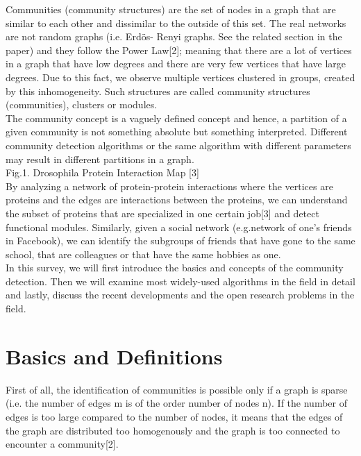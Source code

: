 \documentclass[10pt]{article}
\begin{document}
Communities (community structures) are the set of nodes in a graph that are similar to each other and dissimilar to the outside of this set. The real networks are not random graphs (i.e. Erdös- Renyi graphs. See the related section in the paper) and they follow the Power Law[2]; meaning that there are a lot of vertices in a graph that have low degrees and there are very few vertices that have large degrees. Due to this fact, we observe multiple vertices clustered in groups, created by this inhomogeneity. Such structures are called community structures (communities), clusters or modules. \\

The community concept is a vaguely defined concept and hence, a partition of a given community is not something absolute but something interpreted. Different community detection algorithms or the same algorithm with different parameters may result in different partitions in a graph.\\

Fig.1. Drosophila Protein Interaction Map [3] \\

By analyzing a network of protein-protein interactions where the vertices are proteins and the edges are interactions between the proteins, we can understand the subset of proteins that are specialized in one certain job[3] and detect functional modules. Similarly, given a social network (e.g.network of one’s friends in Facebook), we can identify the subgroups of friends that have gone to the same school, that are colleagues or that have the same hobbies as one. \\

In this survey, we will first introduce the basics and concepts of the community detection. Then we will examine most widely-used algorithms in the field in detail and lastly, discuss the recent developments and the open research problems in the field. \\

\section{Basics and Definitions} 

First of all, the identification of communities is possible only if a graph is sparse (i.e. the number of edges m is of the order number of nodes n). If the number of edges is too large compared to the number of nodes, it means that the edges of the graph are distributed too homogenously and the graph is too connected to encounter a community[2]. \\
\end{document}
